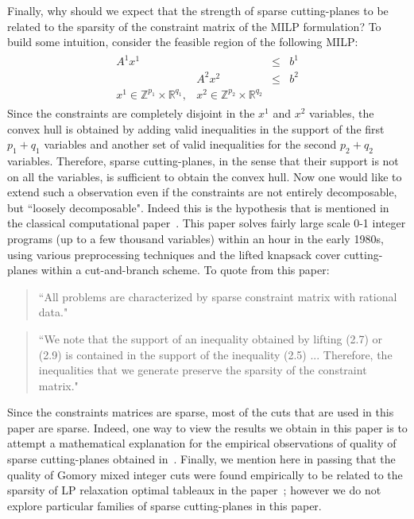\documentclass[smallextended]{svjour3}
\begin{document}
Finally, why should we expect that the strength of sparse cutting-planes to be related to the sparsity of the constraint matrix of the MILP formulation? To build some intuition, consider the feasible region of the following MILP:
\begin{eqnarray*}
\begin{array}{llcl}
A^1x^1& &\leq &b^1\\
&A^2x^2&\leq& b^2\\
x^1\in \mathbb{Z}^{p_1}\times \mathbb{R}^{q_1},&x^2\in \mathbb{Z}^{p_2}\times \mathbb{R}^{q_2}&\end{array}
\end{eqnarray*}
Since the constraints are completely disjoint in the $x^1$ and $x^2$ variables, the convex hull is obtained by adding valid inequalities in the support of the first $p_1 + q_1$ variables and another set of valid inequalities for the second $p_2 + q_2$ variables. Therefore, sparse cutting-planes, in the sense that their support is not on all the variables, is sufficient to obtain the convex hull. Now one would like to extend such a observation even if the constraints are not entirely decomposable, but ``loosely decomposable". Indeed this is the hypothesis that is mentioned in the classical computational paper~\cite{crowder:jo:pa:1983}. This paper solves fairly large scale 0-1 integer programs (up to a few thousand variables) within an hour in the early 1980s, using various preprocessing techniques and the lifted knapsack cover cutting-planes within a cut-and-branch scheme. To quote from this paper:
\begin{quote}``All problems are characterized by {sparse} constraint matrix with rational data."
\end{quote}
\begin{quote}
``We note that the {support} of an inequality obtained by lifting (2.7) or (2.9) is contained in the support of the inequality (2.5) ... Therefore, the inequalities that we generate preserve the sparsity of the constraint matrix."
\end{quote}
Since the constraints matrices are sparse, most of the cuts that are used in this paper are sparse. Indeed, one way to view the results we obtain in this paper is to attempt a mathematical explanation for the empirical observations of quality of sparse cutting-planes obtained in~\cite{crowder:jo:pa:1983}. Finally, we mention here in passing that the quality of Gomory mixed integer cuts were found empirically to be related to the sparsity of LP relaxation optimal tableaux in the paper~\cite{dey:lo:wo:tr:2014}; however we do not explore particular families of sparse cutting-planes in this paper. 
\end{document}
